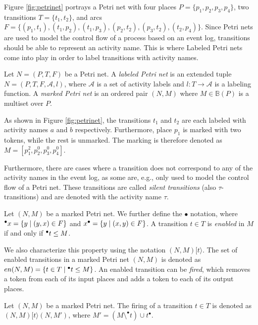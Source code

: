 Figure \ref{fig:petrinet} portrays a Petri net with four places $P = \{p_1, p_2, p_3, p_4\}$, two transitions $T = \{t_1, t_2\}$, and arcs $F = \{ (p_1, t_1), (t_1, p_2), (t_1, p_3), (p_2, t_2), (p_3, t_2), (t_2, p_4) \}$. Since Petri nets are used to model the control flow of a process based on an event log, transitions should be able to represent an activity name. This is where Labeled Petri nets come into play in order to label transitions with activity names.

\begin{definition}
    Let $N = (P, T, F)$ be a Petri net. A \emph{labeled Petri net} is an extended tuple $N = (P, T, F, \mathcal{A}, l)$, where $\mathcal{A}$ is a set of activity labels and $l: T \rightarrow \mathcal{A}$ is a labeling function. A \emph{marked Petri net} is an ordered pair $(N, M)$ where $M \in \mathbb{B}(P)$ is a multiset over $P$.
\end{definition}

As shown in Figure \ref{fig:petrinet}, the transitions $t_1$ and $t_2$ are each labeled with activity names $a$ and $b$ respectively. Furthermore, place $p_1$ is marked with two tokens, while the rest is unmarked. The marking is therefore denoted as $M = [p_1^2, p_2^0, p_3^0, p_4^0]$.

Furthermore, there are cases where a transition does not correspond to any of the activity names in the event log, as some are, e.g., only used to model the control flow of a Petri net. These transitions are called \emph{silent transitions} (also $\tau$-transitions) and are denoted with the activity name $\tau$.

\begin{definition}
    Let $(N, M)$ be a marked Petri net.  We further define the $\bullet$ notation, where ${^{\bullet}x} = \{ y \mid (y, x) \in F \}$ and $x^{\bullet}= \{ y \mid (x, y) \in F \}$. A transition $t \in T$ is \emph{enabled} in $M$ if and only if ${^{\bullet}t} \leq M$.
\end{definition}

We also characterize this property using the notation $(N, M)[t\rangle$. The set of enabled transitions in a marked Petri net $(N, M)$ is denoted as $en(N, M) = \{ t \in T \mid {^{\bullet}t} \leq M \}$. An enabled transition can be \emph{fired}, which removes a token from each of its input places and adds a token to each of its output places.

\begin{definition}
    Let $(N, M)$ be a marked Petri net. The firing of a transition $t \in T$ is denoted as $(N, M) [t\rangle (N, M')$, where $M' = (M \setminus ^{\bullet}t) \cup t^{\bullet}$.
\end{definition}

